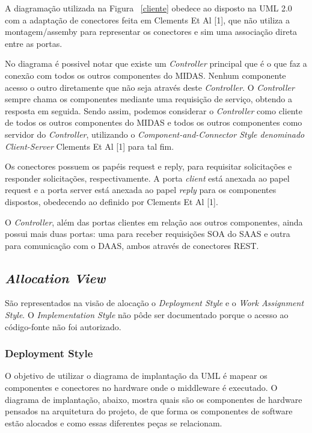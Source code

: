 \documentclass[11pt,a4paper]{article}
\begin{document}
A diagramação utilizada na Figura ~\ref{cliente} obedece ao disposto na UML 2.0 com a adaptação de conectores feita em Clements Et Al [1], que não utiliza a montagem/assemby para representar os conectores e sim uma associação direta entre as portas.

No diagrama é possivel notar que existe um \textit{Controller} principal que é o que faz a conexão com todos os outros componentes do MIDAS. Nenhum componente acesso o outro diretamente que não seja através deste \textit{Controller}. O \textit{Controller} sempre chama os componentes mediante uma requisição de serviço, obtendo a resposta em seguida. Sendo assim, podemos considerar o \textit{Controller} como cliente de todos os outros componentes do MIDAS e todos os outros componentes como servidor do \textit{Controller}, utilizando o \textit{Component-and-Connector Style denominado  Client-Server} Clements Et Al [1] para tal fim.

Os conectores possuem os papéis request e reply, para requisitar solicitações e responder solicitações, respectivamente. A porta \textit{client} está anexada ao papel request e a porta server está anexada ao papel \textit{reply} para os componentes dispostos, obedecendo ao definido por Clements Et Al [1].

O \textit{Controller}, além das portas clientes em relação aos outros componentes, ainda possui mais duas portas: uma para receber requisições SOA do SAAS e outra para comunicação com o DAAS, ambos através de conectores REST.

\newpage
\subsection{\textit{Allocation View}}\label{sec:aloc}
\label{subsec:av}
São representados na visão de alocação o \textit{Deployment Style} e o  \textit{Work Assignment Style}. O \textit{Implementation Style} não pôde ser documentado porque o acesso ao código-fonte não foi autorizado.

\subsubsection{Deployment Style}
O objetivo de utilizar o diagrama de implantação da UML é mapear os componentes e conectores no hardware onde o middleware é executado. O diagrama de implantação, abaixo, mostra quais são os componentes de hardware pensados na arquitetura do projeto, de que forma os componentes de software estão alocados e como essas diferentes peças se relacionam.
\end{document}
